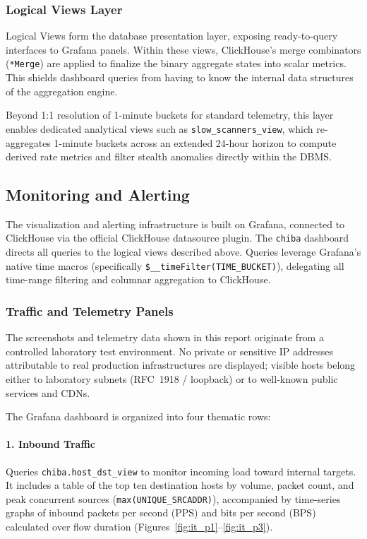 \documentclass[11pt,a4paper]{article}
\newenvironment{notebox}[1][Note]{%
    \begin{tcolorbox}[
        colback=notebg,
        colframe=noteaccent,
        boxrule=0.7pt,
        arc=1.5mm,
        left=3.5mm,
        right=3.5mm,
        top=2.5mm,
        bottom=2.5mm,
        title={#1},
        fonttitle=\sffamily\bfseries\small
    ]
}{%
    \end{tcolorbox}
}
\begin{document}
\subsubsection{Logical Views Layer}
Logical Views form the database presentation layer, exposing ready-to-query interfaces to Grafana panels. Within these views, ClickHouse's merge combinators (\texttt{*Merge}) are applied to finalize the binary aggregate states into scalar metrics. This shields dashboard queries from having to know the internal data structures of the aggregation engine.

Beyond 1:1 resolution of 1-minute buckets for standard telemetry, this layer enables dedicated analytical views such as \texttt{slow\_scanners\_view}, which re-aggregates 1-minute buckets across an extended 24-hour horizon to compute derived rate metrics and filter stealth anomalies directly within the DBMS.

\subsection{Monitoring and Alerting}
The visualization and alerting infrastructure is built on Grafana, connected to ClickHouse via the official ClickHouse datasource plugin. The \texttt{chiba} dashboard directs all queries to the logical views described above. Queries leverage Grafana's native time macros (specifically \texttt{\$\_\_timeFilter(TIME\_BUCKET)}), delegating all time-range filtering and columnar aggregation to ClickHouse.

\subsubsection{Traffic and Telemetry Panels}

\begin{notebox}[Privacy Disclaimer]
The screenshots and telemetry data shown in this report originate from a controlled laboratory test environment. No private or sensitive IP addresses attributable to real production infrastructures are displayed; visible hosts belong either to laboratory subnets (RFC~1918 / loopback) or to well-known public services and CDNs.
\end{notebox}

The Grafana dashboard is organized into four thematic rows:

\paragraph{1. Inbound Traffic}
Queries \texttt{chiba.host\_dst\_view} to monitor incoming load toward internal targets. It includes a table of the top ten destination hosts by volume, packet count, and peak concurrent sources (\texttt{max(UNIQUE\_SRCADDR)}), accompanied by time-series graphs of inbound packets per second (PPS) and bits per second (BPS) calculated over flow duration (Figures~\ref{fig:it_p1}--\ref{fig:it_p3}).
\end{document}
